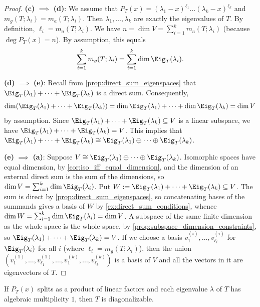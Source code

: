\begin{proof}
  \textbf{(c)} $\implies$ \textbf{(d)}: We assume that $P_T(x) = (\lambda_1 - x)^{\ell_1} \dots (\lambda_k - x)^{\ell_k}$ and $m_g(T; \lambda_i) = m_a(T; \lambda_i)$.
  Then $\lambda_1, \dots, \lambda_k$ are exactly the eigenvalues of $T$. By definition, $\ell_i = m_a(T; \lambda_i)$.
  We have $n = \dim V = \sum_{i=1}^k m_a(T; \lambda_i)$ (because $\deg P_T(x) = n$).
  By assumption, this equals \[ \sum_{i=1}^k m_g(T; \lambda_i) = \sum_{i=1}^k \dim \Eig_T(\lambda_i). \]

  \textbf{(d)} $\implies$ \textbf{(e)}: Recall from \cref{prop:direct_sum_eigenspaces} that $\Eig_T(\lambda_1) + \dots + \Eig_T(\lambda_k)$ is a direct sum.
  Consequently, \[ \dim(\Eig_T(\lambda_1) + \dots + \Eig_T(\lambda_k)) = \dim \Eig_T(\lambda_1) + \dots + \dim \Eig_T(\lambda_k) = \dim V \] by assumption.
  Since $\Eig_T(\lambda_1) + \dots + \Eig_T(\lambda_k) \subseteq V$ is a linear subspace, we have $\Eig_T(\lambda_1) + \dots + \Eig_T(\lambda_k) = V$.
  This implies that $\Eig_T(\lambda_1) + \dots + \Eig_T(\lambda_k) \cong \Eig_T(\lambda_1) \oplus \dots \oplus \Eig_T(\lambda_k)$.

  \textbf{(e)} $\implies$ \textbf{(a)}: Suppose $V \cong \Eig_T(\lambda_1) \oplus \dots \oplus \Eig_T(\lambda_k)$. Isomorphic spaces have equal dimension, by \cref{cor:iso_iff_equal_dimension}, and the dimension of an external direct sum is the sum of the dimensions, so $\dim V = \sum_{i=1}^k \dim \Eig_T(\lambda_i)$. Put $W := \Eig_T(\lambda_1) + \dots + \Eig_T(\lambda_k) \subseteq V$. The sum is direct by \cref{prop:direct_sum_eigenspaces}, so concatenating bases of the summands gives a basis of $W$ by \cref{ex:direct_sum_conditions}, whence $\dim W = \sum_{i=1}^k \dim \Eig_T(\lambda_i) = \dim V$. A subspace of the same finite dimension as the whole space is the whole space, by \cref{prop:subspace_dimension_constraints}, so $\Eig_T(\lambda_1) + \dots + \Eig_T(\lambda_k) = V$.
  If we choose a basis $v_1^{(i)}, \dots, v_{\ell_i}^{(i)}$ for $\Eig_T(\lambda_i)$ for all $i$ (where $\ell_i = m_g(T; \lambda_i)$), then the union $(v_1^{(1)}, \dots, v_{\ell_1}^{(1)}, \dots, v_1^{(k)}, \dots, v_{\ell_k}^{(k)})$ is a basis of $V$ and all the vectors in it are eigenvectors of $T$.
\end{proof}

\begin{corollary}\label{cor:sufficient_diag}
  If $P_T(x)$ splits as a product of linear factors and each eigenvalue $\lambda$ of $T$ has algebraic multiplicity $1$, then $T$ is diagonalizable.
\end{corollary}

